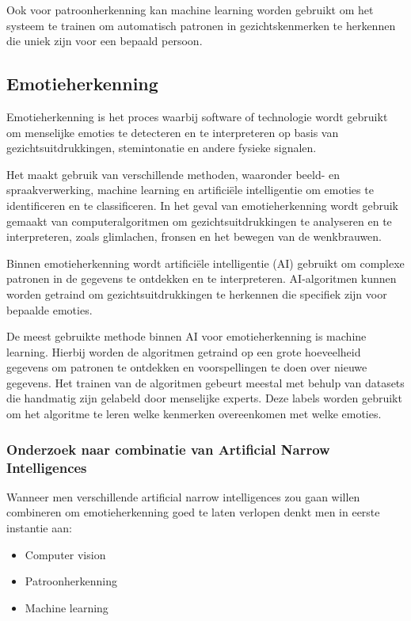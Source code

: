 Ook voor patroonherkenning kan machine learning worden gebruikt om het systeem te trainen om automatisch patronen in gezichtskenmerken te herkennen die uniek zijn voor een bepaald persoon.

\subsection{Emotieherkenning}

Emotieherkenning is het proces waarbij software of technologie wordt gebruikt om menselijke emoties te detecteren en te interpreteren op basis van gezichtsuitdrukkingen, stemintonatie en andere fysieke signalen.

Het maakt gebruik van verschillende methoden, waaronder beeld- en spraakverwerking, machine learning en artificiële intelligentie om emoties te identificeren en te classificeren. In het geval van emotieherkenning wordt gebruik gemaakt van computeralgoritmen om gezichtsuitdrukkingen te analyseren en te interpreteren, zoals glimlachen, fronsen en het bewegen van de wenkbrauwen.

Binnen emotieherkenning wordt artificiële intelligentie (AI) gebruikt om complexe patronen in de gegevens te ontdekken en te interpreteren. AI-algoritmen kunnen worden getraind om gezichtsuitdrukkingen te herkennen die specifiek zijn voor bepaalde emoties.

De meest gebruikte methode binnen AI voor emotieherkenning is machine learning. Hierbij worden de algoritmen getraind op een grote hoeveelheid gegevens om patronen te ontdekken en voorspellingen te doen over nieuwe gegevens. Het trainen van de algoritmen gebeurt meestal met behulp van datasets die handmatig zijn gelabeld door menselijke experts. Deze labels worden gebruikt om het algoritme te leren welke kenmerken overeenkomen met welke emoties.

\subsubsection{Onderzoek naar combinatie van Artificial Narrow Intelligences}

Wanneer men verschillende artificial narrow intelligences zou gaan willen combineren om emotieherkenning goed te laten verlopen denkt men in eerste instantie aan:

\begin{itemize}
    \item Computer vision
    \item Patroonherkenning
    \item Machine learning
\end{itemize}

